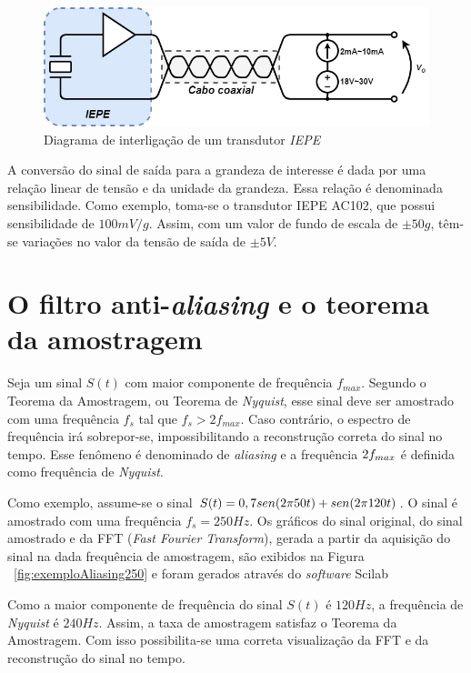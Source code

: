 \documentclass[
	12pt,				%
	openright,			%
	twoside,			%
	a4paper,			%
	english,			%
	french,				%
	spanish,			%
	brazil,				%
	]{abntex2}
\begin{document}
		\begin{figure}[H]
			\centering
			\includegraphics[width=\linewidth]{../Fotos/Diagramas/iepe.png}
			\caption{Diagrama de interligação de um transdutor \textit{IEPE}}
			\label{fig:ligacaoIEPE}
		\end{figure}

		A conversão do sinal de saída para a grandeza de interesse é dada
		por uma relação linear de tensão e da unidade da grandeza. Essa
		relação é denominada sensibilidade. Como exemplo, toma-se o
		transdutor IEPE AC102, que possui sensibilidade de $100mV/g$.
		Assim, com um valor de fundo de escala de $\pm50g$, têm-se variações
		no valor da tensão de saída de $\pm5V$.\cite{ctc}

	\section{O filtro anti-\textit{aliasing} e o teorema da amostragem}
		Seja um sinal $S(t)$ com maior componente de frequência
		$f_{max}$. Segundo o Teorema da Amostragem, ou Teorema de
		\textit{Nyquist}, esse sinal deve ser amostrado com uma
		frequência $f_s$ tal que $f_s>2f_{max}$. Caso contrário, o
		espectro de frequência irá sobrepor-se, impossibilitando a
		reconstrução correta do sinal no tempo. Esse fenômeno é denominado
		de \textit{aliasing} e a frequência $2\*f_{max}$ é definida como
		frequência de \textit{Nyquist}. \cite{nyquist}

		Como exemplo, assume-se o sinal $S(t) = 0,7\*sen(2\*\pi\*50\*t)
		+ sen(2\*\pi\*120\*t)$. O sinal é amostrado com uma frequência
		$f_s = 250Hz$. Os gráficos do sinal original, do sinal
		amostrado e da FFT (\textit{Fast Fourier Transform}), gerada a
		partir da aquisição do sinal na dada frequência de amostragem,
		são exibidos na Figura ~\ref{fig:exemploAliasing250} e foram gerados
		através do \textit{software} Scilab

		Como a maior componente de frequência do sinal $S(t)$ é $120Hz$,
		a frequência de \textit{Nyquist} é $240Hz$. Assim, a taxa de
		amostragem satisfaz o Teorema da Amostragem. Com isso possibilita-se
		uma correta visualização da FFT e da reconstrução do sinal no tempo.
\end{document}
